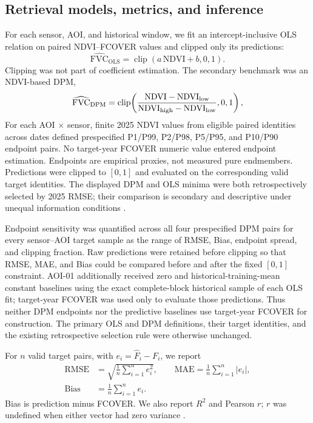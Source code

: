 \subsection{Retrieval models, metrics, and inference}
For each sensor, AOI, and historical window, we fit an intercept-inclusive OLS relation on paired NDVI--FCOVER values and clipped only its predictions:
\begin{equation}
\widehat{\mathrm{FVC}}_{\mathrm{OLS}}=\operatorname{clip}(a\,\mathrm{NDVI}+b,0,1).
\end{equation}
Clipping was not part of coefficient estimation. The secondary benchmark was an NDVI-based DPM,
\begin{equation}
\widehat{\mathrm{FVC}}_{\mathrm{DPM}}=\operatorname{clip}\!\left(\frac{\mathrm{NDVI}-\mathrm{NDVI}_{\rm low}}{\mathrm{NDVI}_{\rm high}-\mathrm{NDVI}_{\rm low}},0,1\right),
\end{equation}
For each AOI $\times$ sensor, finite 2025 NDVI values from eligible paired identities across dates defined prespecified P1/P99, P2/P98, P5/P95, and P10/P90 endpoint pairs. No target-year FCOVER numeric value entered endpoint estimation. Endpoints are empirical proxies, not measured pure endmembers. Predictions were clipped to $[0,1]$ and evaluated on the corresponding valid target identities. The displayed DPM and OLS minima were both retrospectively selected by 2025 RMSE; their comparison is secondary and descriptive under unequal information conditions \citep{gutman1998,huete1988,montandon2008,jiapaer2011,yan2022dpm,mu2024}.

Endpoint sensitivity was quantified across all four prespecified DPM pairs for every sensor--AOI target sample as the range of RMSE, Bias, endpoint spread, and clipping fraction. Raw predictions were retained before clipping so that RMSE, MAE, and Bias could be compared before and after the fixed $[0,1]$ constraint. AOI-01 additionally received zero and historical-training-mean constant baselines using the exact complete-block historical sample of each OLS fit; target-year FCOVER was used only to evaluate those predictions. Thus neither DPM endpoints nor the predictive baselines use target-year FCOVER for construction. The primary OLS and DPM definitions, their target identities, and the existing retrospective selection rule were otherwise unchanged.

For $n$ valid target pairs, with $e_i=\widehat F_i-F_i$, we report
\begin{equation}
\begin{aligned}
\mathrm{RMSE}&=\sqrt{\frac{1}{n}\sum_{i=1}^{n}e_i^2},\qquad
\mathrm{MAE}=\frac{1}{n}\sum_{i=1}^{n}|e_i|,\\
\mathrm{Bias}&=\frac{1}{n}\sum_{i=1}^{n}e_i.
\end{aligned}
\end{equation}
Bias is prediction minus FCOVER. We also report $R^2$ and Pearson $r$; $r$ was undefined when either vector had zero variance \citep{willmott2005,chai2014}.


